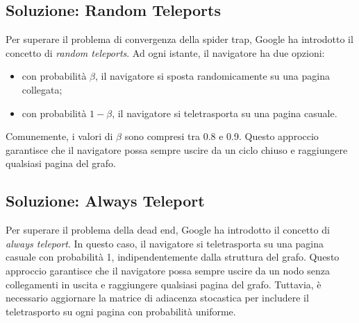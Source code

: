 \documentclass{report}
\begin{document}
	\subsection{Soluzione: Random Teleports}
	Per superare il problema di convergenza della spider trap, Google ha introdotto il concetto di \textit{random teleports}. Ad ogni istante, il navigatore ha due opzioni:
	\begin{itemize}
		\item con probabilità $\beta$, il navigatore si sposta randomicamente su una pagina collegata;
		\item con probabilità $1-\beta$, il navigatore si teletrasporta su una pagina casuale.
	\end{itemize}
	Comunemente, i valori di $\beta$ sono compresi tra 0.8 e 0.9. Questo approccio garantisce che il navigatore possa sempre uscire da un ciclo chiuso e raggiungere qualsiasi pagina del grafo.
	
	\subsection{Soluzione: Always Teleport}
	Per superare il problema della dead end, Google ha introdotto il concetto di \textit{always teleport}. In questo caso, il navigatore si teletrasporta su una pagina casuale con probabilità 1, indipendentemente dalla struttura del grafo. Questo approccio garantisce che il navigatore possa sempre uscire da un nodo senza collegamenti in uscita e raggiungere qualsiasi pagina del grafo. Tuttavia, è necessario aggiornare la matrice di adiacenza stocastica per includere il teletrasporto su ogni pagina con probabilità uniforme.
\end{document}
